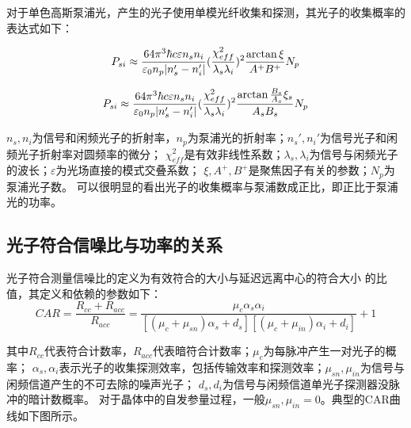 \documentclass[a4paper,UTF8]{ctexart}
\begin{document}
对于单色高斯泵浦光，产生的光子使用单模光纤收集和探测，其光子的收集概率的表达式如下：

\begin{equation}
    P_{si} \approx \frac{64\pi^3\hbar c \varepsilon n_s n_i}{\varepsilon_0 n_p \abs{n_s'-n_i'}}(\frac{\chi_{eff}^2}{\lambda_s \lambda_i})^2 \frac{\arctan\xi}{A^{+}B^{+}} N_p
\end{equation}

\begin{equation}
    P_{si} \approx \frac{64\pi^3\hbar c \varepsilon n_s n_i}{\varepsilon_0 n_p \abs{n_s'-n_i'}}(\frac{\chi_{eff}^2}{\lambda_s \lambda_i})^2 \frac{\arctan\frac{B_s}{A_s}\xi_s}{A_s B_s} N_p
\end{equation}

$n_s,n_i$为信号和闲频光子的折射率，$n_p$为泵浦光的折射率；$n_s',n_i'$为信号光子和闲频光子折射率对圆频率的微分；
$\chi_{eff}^2$是有效非线性系数；$\lambda_s,\lambda_i$为信号与闲频光子的波长；$\varepsilon$为光场直接的模式交叠系数；
$\xi,A^{+},B^{+}$是聚焦因子有关的参数；$N_p$为泵浦光子数。
可以很明显的看出光子的收集概率与泵浦数成正比，即正比于泵浦光的功率。

\subsection{光子符合信噪比与功率的关系}

光子符合测量信噪比的定义为有效符合的大小与延迟远离中心的符合大小
的比值，其定义和依赖的参数如下：
\begin{equation}
    CAR = \frac{R_{cc} + R_{acc}}{R_{acc}} = \frac{\mu_c \alpha_s \alpha_i}{[(\mu_c +\mu_{sn})\alpha_s + d_s][(\mu_c+\mu_{in})\alpha_i+d_i]}+1
\end{equation}

其中$R_{cc}$代表符合计数率，$R_{acc}$代表暗符合计数率；$\mu_c$为每脉冲产生一对光子的概率；
$\alpha_s,\alpha_i$表示光子的收集探测效率，包括传输效率和探测效率；$\mu_{sn},\mu_{in}$为信号与闲频信道产生的不可去除的噪声光子；
$d_s,d_i$为信号与闲频信道单光子探测器没脉冲的暗计数概率。
对于晶体中的自发参量过程，一般$\mu_{sn},\mu_{in}=0$。典型的CAR曲线如下图所示。
\end{document}

